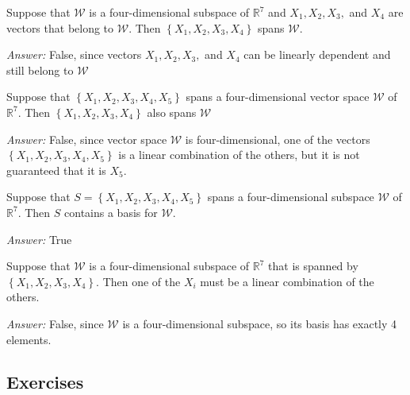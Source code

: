 \documentclass[letterpaper]{article}
\newcommand{\ans}{\textit{Answer: }}
\newenvironment{question}[2][Question]{\begin{trivlist}
\item[\hskip \labelsep {\bfseries #1}\hskip \labelsep {\bfseries #2.}]}{\end{trivlist}}
\begin{document}
\begin{question}{2.15}
    Suppose that $\mathcal { W }$ is a four-dimensional subspace of
    $\mathbb { R } ^ { 7 }$ and $X _ { 1 } , X _ { 2 } , X _ { 3 } ,$ and $X _ { 4 }$
    are vectors that belong to $\mathcal { W } .$ Then $\left\{ X _ { 1 } , X _ { 2 } ,
    X _ { 3 } , X _ { 4 } \right\}$ spans $\mathcal { W }$.

    \ans False, since vectors $X _ { 1 } , X _ { 2 } , X _ { 3 } ,$ and $X _ { 4 }$
    can be linearly dependent and still belong to $\mathcal { W }$
\end{question}

\begin{question}{2.16}
    Suppose that $\left\{ X _ { 1 } , X _ { 2 } , X _ { 3 } , X _ { 4 } ,
     X _ { 5 } \right\}$ spans a four-dimensional vector space $\mathcal { W }$ of
    $\mathbb { R } ^ { 7 } .$ Then $\left\{ X _ { 1 } , X _ { 2 } , X _ { 3 } , 
    X _ { 4 } \right\}$ also spans $\mathcal { W }$

    \ans False, since vector space $\mathcal { W }$ is four-dimensional, one of 
    the vectors $\left\{ X _ { 1 } , X _ { 2 } , X _ { 3 } , X _ { 4 } ,
    X _ { 5 } \right\}$ is a linear combination of the others, but it is not guaranteed
    that it is $X _ { 5 }$. 
\end{question}

\begin{question}{2.17}
    Suppose that $S = \left\{ X _ { 1 } , X _ { 2 } , X _ { 3 } , X _ { 4 } , 
    X _ { 5 } \right\}$ spans a four-dimensional subspace $\mathcal { W }$ of
    $\mathbb { R } ^ { 7 } .$ Then $S$ contains a basis for $\mathcal { W } .$

    \ans True
\end{question}

\begin{question}{2.19}
    Suppose that $\mathcal { W }$ is a four-dimensional subspace of $\mathbb { R } ^ { 7 }$ that is spanned by
    $\left\{ X _ { 1 } , X _ { 2 } , X _ { 3 } , X _ { 4 } \right\} .$ 
    Then one of the $X _ { i }$ must be a linear combination of the others.

    \ans False, since $\mathcal { W }$ is a four-dimensional subspace, so its basis
    has exactly 4 elements. 
\end{question}

\subsection{Exercises}
\end{document}
